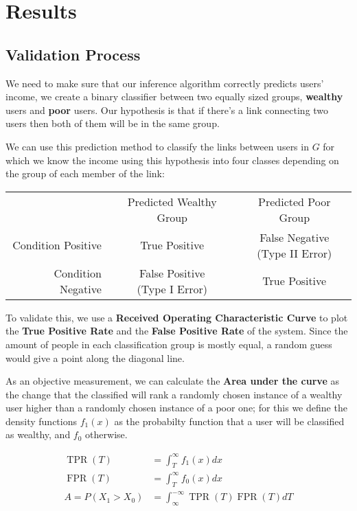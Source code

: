 \section{Results}

\subsection{Validation Process}

We need to make sure that our inference algorithm correctly predicts users' income, we create a binary classifier between two equally sized groups, \textbf{wealthy} users and \textbf{poor} users. Our hypothesis is that if there's a link connecting two users then both of them will be in the same group.

We can use this prediction method to classify the links between users in $ G $ for which we know the income using this hypothesis into four classes depending on the group of each member of the link:

\begin{tabularx}{\textwidth}{ r c c }
& Predicted Wealthy Group & Predicted Poor Group \\
Condition Positive & \cellcolor{green} True Positive & \cellcolor{red} \makecell{False Negative \\ (Type II Error)} \\ 
Condition Negative & \cellcolor{red} \makecell{False Positive \\ (Type I Error)} & \cellcolor{green} True Positive \\
\end{tabularx}

To validate this, we use a \textbf{Received Operating Characteristic Curve} to plot the \textbf{True Positive Rate} and the \textbf{False Positive Rate} of the system. Since the amount of people in each classification group is mostly equal, a random guess would give a point along the diagonal line.

As an objective measurement, we can calculate the \textbf{Area under the curve} as the change that the classified will rank a randomly chosen instance of a wealthy user higher than a randomly chosen instance of a poor one; for this we define the density functions $ f_1(x) $ as the probabilty function that a user will be classified as wealthy, and $ f_0 $ otherwise.

\begin{align*}
\operatorname{TPR}(T) &= \int^{\infty}_T f_1(x) dx \\
\operatorname{FPR}(T) &= \int^{\infty}_T f_0(x) dx \\
A = P(X_1 > X_0) &= \int^{-\infty}_{\infty} \operatorname{TPR}(T) \operatorname{FPR}(T) dT
\end{align*}